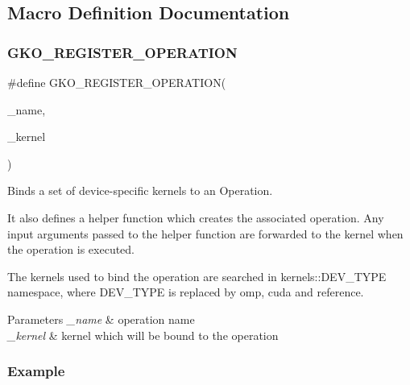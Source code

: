\subsection{Macro Definition Documentation}
\mbox{\label{group__Executor_ga7f2c119ff9f4f51c7f8e2d5dbbbbd044}} 
\subsubsection{\texorpdfstring{G\+K\+O\+\_\+\+R\+E\+G\+I\+S\+T\+E\+R\+\_\+\+O\+P\+E\+R\+A\+T\+I\+ON}{GKO\_REGISTER\_OPERATION}}
{\footnotesize\ttfamily \#define G\+K\+O\+\_\+\+R\+E\+G\+I\+S\+T\+E\+R\+\_\+\+O\+P\+E\+R\+A\+T\+I\+ON(\begin{DoxyParamCaption}\item[{}]{\+\_\+name,  }\item[{}]{\+\_\+kernel }\end{DoxyParamCaption})}



Binds a set of device-\/specific kernels to an Operation. 

It also defines a helper function which creates the associated operation. Any input arguments passed to the helper function are forwarded to the kernel when the operation is executed.

The kernels used to bind the operation are searched in {\ttfamily kernels\+::\+D\+E\+V\+\_\+\+T\+Y\+PE} namespace, where {\ttfamily D\+E\+V\+\_\+\+T\+Y\+PE} is replaced by {\ttfamily omp}, {\ttfamily cuda} and {\ttfamily reference}.


\begin{DoxyParams}{Parameters}
{\em \+\_\+name} & operation name \\
\hline
{\em \+\_\+kernel} & kernel which will be bound to the operation\\
\hline
\end{DoxyParams}
\subsubsection*{Example }


